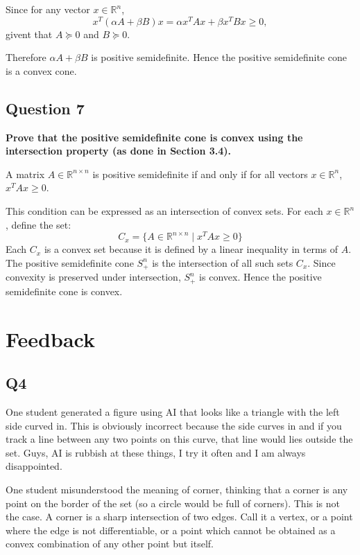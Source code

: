 Since for any vector \( x \in \mathbb{R}^n \),
\[
x^T (\alpha A + \beta B) x = \alpha x^T A x + \beta x^T B x \geq 0,
\]
givent that \( A \succeq 0 \) and \( B \succeq 0 \).

Therefore \( \alpha A + \beta B \) is positive semidefinite. Hence the positive semidefinite cone is a convex cone.

\subsection*{Question 7}
\textbf{Prove that the positive semideﬁnite cone is convex using the intersection property (as done in Section 3.4).}

A matrix \( A \in \mathbb{R}^{n \times n} \) is positive semidefinite if and only if for all vectors \( x \in \mathbb{R}^n \), \( x^T A x \geq 0 \).

This condition can be expressed as an intersection of convex sets. For each \( x \in \mathbb{R}^n \), define the set:
\[
C_x = \{ A \in \mathbb{R}^{n \times n} \mid x^T A x \geq 0 \}
\]
Each \( C_x \) is a convex set because it is defined by a linear inequality in terms of \( A \). The positive semidefinite cone \( S_+^n \) is the intersection of all such sets \( C_x \). Since convexity is preserved under intersection, \( S_+^n \) is convex. Hence the positive semidefinite cone is convex. 

\newpage

\section*{Feedback}

\subsection*{Q4}

One student generated a figure using AI that looks like a triangle with the left side curved in. This is obviously incorrect because the side curves in and if you track a line between any two points on this curve, that line would lies outside the set. Guys, AI is rubbish at these things, I try it often and I am always disappointed. 

One student misunderstood the meaning of corner, thinking that a corner is any point on the border of the set (so a circle would be full of corners). This is not the case. A corner is a sharp intersection of two edges. Call it a vertex, or a point where the edge is not differentiable, or a point which cannot be obtained as a convex combination of any other point but itself.

